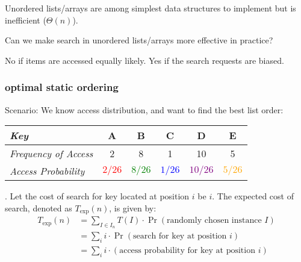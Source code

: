 \documentclass{article}
\begin{document}
Unordered lists/arrays are among simplest data structures to implement but  is inefficient ($\Theta(n)$). 

\begin{Question}{}
    Can we make search in unordered lists/arrays more effective in practice?
\end{Question}

\begin{solution}
    No if items are accessed equally likely. Yes if the search requests are biased. 
\end{solution}

\subsubsection{optimal static ordering} 

\begin{Question}{}
    Scenario: We know access distribution, and want to find the best list order: \begin{center}
        \begin{tabular}{|l|c|c|c|c|c|}
            \hline
            \textit{Key}           
            & A  & B  & C  & D  & E  \\ \hline
            \textit{Frequency of Access} \qquad 
            & 2  & 8  & 1  & 10 & 5  \\ \hline
            \textit{Access Probability}   
            & \textcolor{red}{$2 / 26$} & \textcolor{green}{$8 / 26$} & \textcolor{blue}{$1 / 26$} & \textcolor{purple}{$10 / 26$} & \textcolor{orange}{$5 / 26$} \\ \hline
        \end{tabular}
    \end{center}
\end{Question}

\begin{deff}[ \index{}].
    Let the cost of search for key located at position \(i\) be \(i\).
    The expected cost of search, denoted as $T_{\text{exp}}(n)$, is given by: \begin{align*}
        T_{\text{exp}}(n) 
        & = \sum_{I \in I_n} T(I) \cdot \Pr(\text{randomly chosen instance } I) \\ 
        & = \sum_i i \cdot \Pr(\text{search for key at position } i) \\ 
        & = \sum_i i \cdot (\text{access probability for key at position } i)
    \end{align*}
\end{deff}
\end{document}
